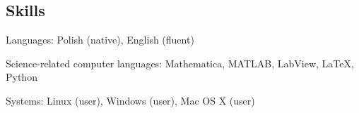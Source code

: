 \documentclass[margin,line]{resume}
\begin{document}
\begin{resume}
    \section{\mysidestyle Skills}
    \begin{list2}
        \item Languages: Polish (native), English (fluent)
        \item Science-related computer languages: Mathematica, MATLAB, LabView, LaTeX, Python
        \item Systems: Linux (user), Windows (user), Mac OS X (user)
    \end{list2}


\end{resume}
\end{document}
